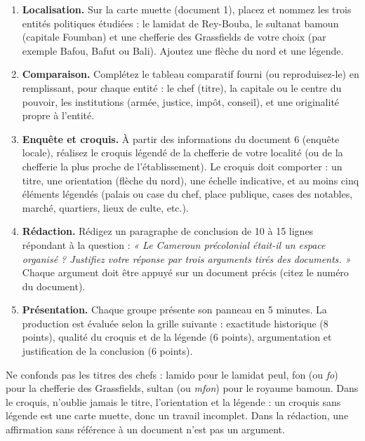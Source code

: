 \documentclass[11pt]{article}
\newcommand{\cle}[1]{{\popxbold\color{popdark}#1}}
\newcounter{popsec}
\newcounter{popsub}
\newcommand{\courssub}[1]{%
  \stepcounter{popsub}%
  \par\vspace{9pt}\noindent{\popxbold\fontsize{11.5}{13}\selectfont\color{popink}{\color{poporange}\thepopsec.\thepopsub}\hspace{6pt}#1}\par\nopagebreak\vspace{4pt}
}
\begin{document}
\begin{enumerate}
\item \textbf{Localisation.} Sur la carte muette (document 1), placez et nommez les trois entités politiques étudiées : le lamidat de Rey-Bouba, le sultanat bamoun (capitale Foumban) et une chefferie des Grassfields de votre choix (par exemple Bafou, Bafut ou Bali). Ajoutez une flèche du nord et une légende.
\item \textbf{Comparaison.} Complétez le tableau comparatif fourni (ou reproduisez-le) en remplissant, pour chaque entité : le chef (titre), la capitale ou le centre du pouvoir, les institutions (armée, justice, impôt, conseil), et une originalité propre à l'entité.
\item \textbf{Enquête et croquis.} À partir des informations du document 6 (enquête locale), réalisez le \cle{croquis} légendé de la chefferie de votre localité (ou de la chefferie la plus proche de l'établissement). Le croquis doit comporter : un titre, une orientation (flèche du nord), une échelle indicative, et au moins cinq éléments légendés (palais ou case du chef, place publique, cases des notables, marché, quartiers, lieux de culte, etc.).
\item \textbf{Rédaction.} Rédigez un paragraphe de conclusion de 10 à 15 lignes répondant à la question : \emph{« Le Cameroun précolonial était-il un espace organisé ? Justifiez votre réponse par trois arguments tirés des documents. »} Chaque argument doit être appuyé sur un document précis (citez le numéro du document).
\item \textbf{Présentation.} Chaque groupe présente son panneau en 5 minutes. La production est évaluée selon la grille suivante : exactitude historique (8 points), qualité du croquis et de la légende (6 points), argumentation et justification de la conclusion (6 points).
\end{enumerate}

\begin{attention}
Ne confonds pas les titres des chefs : \cle{lamido} pour le lamidat peul, \cle{fon} (ou \emph{fo}) pour la chefferie des Grassfields, \cle{sultan} (ou \emph{mfon}) pour le royaume bamoun. Dans le croquis, n'oublie jamais le titre, l'orientation et la légende : un croquis sans légende est une carte muette, donc un travail incomplet. Dans la rédaction, une affirmation sans référence à un document n'est pas un argument.
\end{attention}

\courssub{Ressources à mobiliser}
\end{document}
